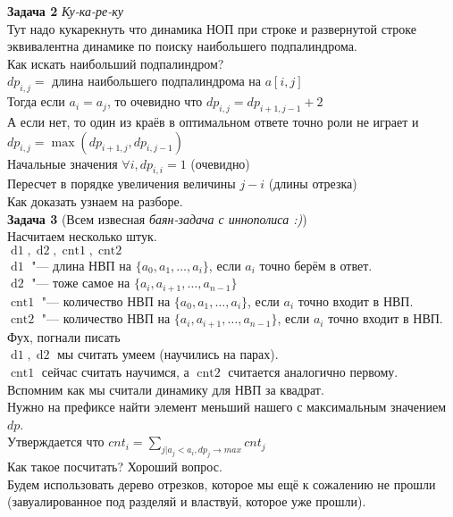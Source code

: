\documentclass[14pt,a4paper,report]{ncc}
\begin{document}
\textbf{Задача 2} \textit{Ку-ка-ре-ку}\\
Тут надо кукарекнуть что динамика НОП при строке и развернутой строке эквивалентна динамике по поиску наибольшего подпалиндрома.\\
Как искать наибольший подпалиндром?\\
$dp_{i, j} = $ длина наибольшего подпалиндрома на $a[i, j]$\\

Тогда если $a_i = a_j$, то очевидно что $dp_{i, j} = dp_{i + 1, j - 1} + 2$\\
А если нет, то один из краёв в оптимальном ответе точно роли не играет и $dp_{i, j} = \max(dp_{i + 1, j}, dp_{i, j - 1})$\\
Начальные значения $\forall i, dp_{i, i} = 1$ (очевидно)\\
Пересчет в порядке увеличения величины $j - i$ (длины отрезка)\\
Как доказать узнаем на разборе.\\

\textbf{Задача 3} (Всем извесная \textit{баян-задача с иннополиса :)})\\
Насчитаем несколько штук.\\
$\operatorname{d1}, \operatorname{d2}, \operatorname{cnt1}, \operatorname{cnt2}$\\
$\operatorname{d1}$ "--- длина НВП на $\{a_0, a_1, \ldots, a_i\}$, если $a_i$ точно берём в ответ.\\
$\operatorname{d2}$ "--- тоже самое на $\{a_i, a_{i + 1}, \ldots, a_{n - 1}\}$\\
$\operatorname{cnt1}$ "--- количество НВП на $\{a_0, a_1, \ldots, a_i\}$, если $a_i$ точно входит в НВП.\\
$\operatorname{cnt2}$ "--- количество НВП на $\{a_i, a_{i + 1}, \ldots, a_{n - 1}\}$, если $a_i$ точно входит в НВП.\\
Фух, погнали писать\\
$\operatorname{d1}, \operatorname{d2}$ мы считать умеем (научились на парах).\\
$\operatorname{cnt1}$ сейчас считать научимся, а $\operatorname{cnt2}$ считается аналогично первому.\\

Вспомним как мы считали динамику для НВП за квадрат.\\
Нужно на префиксе найти элемент меньший нашего с максимальным значением $dp$.\\
Утверждается что $cnt_i = \sum_{j | a_j < a_i, dp_j \rightarrow max} cnt_j$\\
Как такое посчитать? Хороший вопрос.\\
Будем использовать дерево отрезков, которое мы ещё к сожалению не прошли (завуалированное под разделяй и властвуй, которое уже прошли).\\
\end{document}
